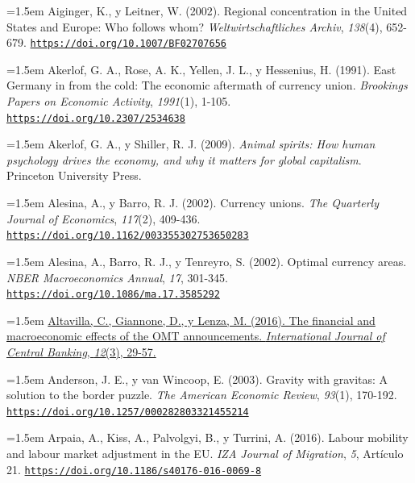 \documentclass[10pt,a4paper]{article}
\begin{document}
\noindent\hangindent=1.5em Aiginger, K., y Leitner, W. (2002). Regional concentration in the United States and Europe: Who follows whom? \textit{Weltwirtschaftliches Archiv}, \textit{138}(4), 652-679. \href{https://doi.org/10.1007/BF02707656}{\nolinkurl{https://doi.org/10.1007/BF02707656}}

\noindent\hangindent=1.5em Akerlof, G. A., Rose, A. K., Yellen, J. L., y Hessenius, H. (1991). East Germany in from the cold: The economic aftermath of currency union. \textit{Brookings Papers on Economic Activity}, \textit{1991}(1), 1-105. \href{https://doi.org/10.2307/2534638}{\nolinkurl{https://doi.org/10.2307/2534638}}

\noindent\hangindent=1.5em Akerlof, G. A., y Shiller, R. J. (2009). \textit{Animal spirits: How human psychology drives the economy, and why it matters for global capitalism}. Princeton University Press.

\noindent\hangindent=1.5em Alesina, A., y Barro, R. J. (2002). Currency unions. \textit{The Quarterly Journal of Economics}, \textit{117}(2), 409-436. \href{https://doi.org/10.1162/003355302753650283}{\nolinkurl{https://doi.org/10.1162/003355302753650283}}

\noindent\hangindent=1.5em Alesina, A., Barro, R. J., y Tenreyro, S. (2002). Optimal currency areas. \textit{NBER Macroeconomics Annual}, \textit{17}, 301-345. \href{https://doi.org/10.1086/ma.17.3585292}{\nolinkurl{https://doi.org/10.1086/ma.17.3585292}}

\noindent\hangindent=1.5em \href{https://www.ijcb.org/journal/ijcb16q3a1.htm}{Altavilla, C., Giannone, D., y Lenza, M. (2016). The financial and macroeconomic effects of the OMT announcements. \textit{International Journal of Central Banking}, \textit{12}(3), 29-57.}

\noindent\hangindent=1.5em Anderson, J. E., y van Wincoop, E. (2003). Gravity with gravitas: A solution to the border puzzle. \textit{The American Economic Review}, \textit{93}(1), 170-192. \href{https://doi.org/10.1257/000282803321455214}{\nolinkurl{https://doi.org/10.1257/000282803321455214}}

\noindent\hangindent=1.5em Arpaia, A., Kiss, A., Palvolgyi, B., y Turrini, A. (2016). Labour mobility and labour market adjustment in the EU. \textit{IZA Journal of Migration}, \textit{5}, Artículo 21. \href{https://doi.org/10.1186/s40176-016-0069-8}{\nolinkurl{https://doi.org/10.1186/s40176-016-0069-8}}
\end{document}
